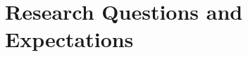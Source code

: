 \documentclass{article}
\begin{document}

\section{Research Questions and Expectations}
\label{questions}
%



\end{document}
